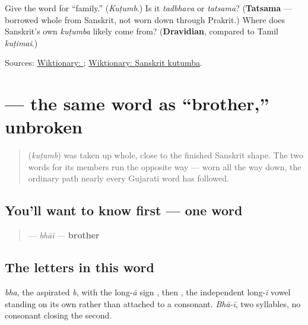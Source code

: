 \begin{tcolorbox}[breakable,colback=teal!4,colframe=teal!35!black,title={Before you move on}]
Give the word for \textquotedblleft{}family.\textquotedblright{} (\emph{Kuṭumb}.) Is it \emph{tadbhava} or \emph{tatsama}? (\textbf{Tatsama} — borrowed whole from Sanskrit, not worn down through Prakrit.) Where does Sanskrit's own \emph{kuṭumba} likely come from? (\textbf{Dravidian}, compared to Tamil \emph{kuṭimai}.)

Sources: \href{https://en.wiktionary.org/wiki/\%E0\%AA\%95\%E0\%AB\%81\%E0\%AA\%9F\%E0\%AB\%81\%E0\%AA\%82\%E0\%AA\%AC}{Wiktionary: }; \href{https://en.wiktionary.org/wiki/\%E0\%A4\%95\%E0\%A5\%81\%E0\%A4\%9F\%E0\%A5\%81\%E0\%A4\%AE\%E0\%A5\%8D\%E0\%A4\%AC}{Wiktionary: Sanskrit kutumba}.
\end{tcolorbox}
\section[bhāī]{ — the same word as \textquotedblleft{}brother,\textquotedblright{} unbroken}

\label{lesson:GU-C11-bhai}



\begin{quote}
\textbf{} (\emph{kuṭumb}) was taken up whole, close to the finished Sanskrit shape. The two words for its members run the opposite way — worn all the way down, the ordinary path nearly every Gujarati word has followed.
\end{quote}

\subsection*{You'll want to know first — one word}
\begin{quote}
\textbf{} — \emph{bhāī} — \textbf{brother}
\end{quote}

\subsection*{The letters in this word}
\textbf{} \emph{bha}, the aspirated \emph{b}, with the long-\emph{ā} sign \textbf{}, then \textbf{}, the independent long-\emph{ī} vowel standing on its own rather than attached to a consonant. \emph{Bhā-ī}, two syllables, no consonant closing the second.


